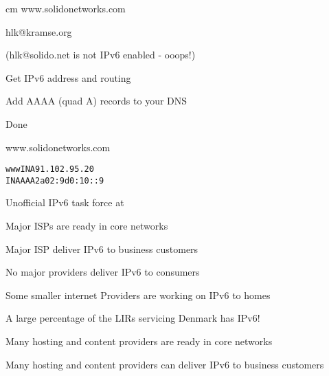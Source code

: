 \documentclass[28pt,landscape,a4paper,footrule]{foils}
\begin{document}

\begin{center}
 cm
\hlkbig
www.solidonetworks.com

hlk@kramse.org 

(hlk@solido.net is not IPv6 enabled - ooops!)

\end{center}


\begin{list1}
\item Get IPv6 address and routing
\item Add AAAA (quad A) records to your DNS
\item Done
\end{list1}
\vskip 1cm
\centerline{\Large www.solidonetworks.com}

\begin{alltt}
\LARGE
www     IN	A       91.102.95.20
        IN	AAAA    2a02:9d0:10::9
\end{alltt}






\begin{list1}
\item Unofficial IPv6 task force at 
\item Major ISPs are ready in core networks
\item Major ISP deliver IPv6 to business customers
\item No major providers deliver IPv6 to consumers
\item Some smaller internet Providers are working on IPv6 to homes
\item A large percentage of the LIRs servicing Denmark has IPv6!
\vskip 1cm 
\item Many hosting and content providers are ready in core networks
\item Many hosting and content providers can deliver IPv6 to business customers
\end{list1}





\end{document}
